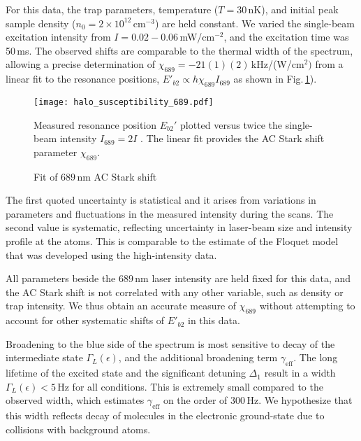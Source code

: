 For this data, the trap parameters, temperature ($T=30$\,nK), and initial peak sample density ($n_0=2\times 10^{12}$\,cm$^{-3}$) are held constant.
We varied the single-beam excitation intensity from $I=0.02-0.06$\,mW/cm$^{-2}$, and the excitation time was 50\,ms.
The observed shifts are comparable to the thermal width of the spectrum, allowing a precise determination of $\chi_{689}=-21(1)(2)$\,kHz/(W/cm$^{2})$ from a linear fit to the resonance positions, $E'_{b2}\propto h\chi_{689} I_{689}$ as shown in Fig.\,\ref{fig:ShiftWith689Intensity}).
	\begin{figure}
	\centerline{
	  \texttt{[image: halo\_susceptibility\_689.pdf]}}
	  \caption{Fit of $689$\,nm AC Stark shift}{Measured resonance position $E_{b2}'$ plotted versus twice the single-beam intensity $I_{689}=2I$ . The linear fit provides the AC Stark shift parameter $\chi_{689}$.}
	  \label{fig:ShiftWith689Intensity}
	\end{figure}
The first quoted uncertainty is statistical and it arises from variations in parameters and fluctuations in the measured intensity during the scans.
The second value is systematic, reflecting uncertainty in laser-beam size and intensity profile at the atoms.
This is comparable to the estimate of the Floquet model that was developed using the high-intensity data.

All parameters beside the $689$\,nm laser intensity are held fixed for this data, and the AC Stark shift is not correlated with any other variable, such as density or trap intensity.
We thus obtain an accurate measure of $\chi_{689}$ without attempting to account for other systematic shifts of $E'_{b2}$ in this data.

Broadening to the blue side of the spectrum is most sensitive to decay of the intermediate state $\Gamma_L(\epsilon)$, and the additional broadening term $\gamma_{\text{eff}}$. 
The long lifetime of the excited state and the significant detuning $\Delta_1$ result in a width $\Gamma_L(\epsilon) < 5\,\text{Hz}$ for all conditions.
This is extremely small compared to the observed width, which estimates $\gamma_{\text{eff}}$ on the order of $300\,\text{Hz}$.
We hypothesize that this width reflects decay of molecules in the electronic ground-state due to collisions with background atoms.

